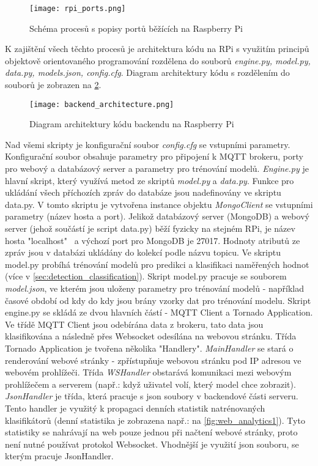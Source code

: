 \begin{figure}[H]
  \centering
  \texttt{[image: rpi\_ports.png]}
  \caption{Schéma procesů s popisy portů běžících na Raspberry Pi}
  \label{fig:rpi_ports}
\end{figure}

K zajištění všech těchto procesů je architektura kódu na RPi s využitím principů objektově orientovaného programování rozdělena do souborů \textit{engine.py, model.py, data.py, models.json, config.cfg}. Diagram architektury kódu s rozdělením do souborů je zobrazen na \cref{fig:backend_architecture}.

\begin{figure}[H]
  \centering
  \texttt{[image: backend\_architecture.png]}
  \caption{Diagram architektury kódu backendu na Raspberry Pi}
  \label{fig:backend_architecture}
\end{figure}

Nad všemi skripty je konfigurační soubor \textit{config.cfg} se vstupními parametry. Konfigurační soubor obsahuje parametry pro připojení k MQTT brokeru, porty pro webový a databázový server a parametry pro trénování modelů. \textit{Engine.py} je hlavní skript, který využívá metod ze skriptů \textit{model.py} a \textit{data.py}. Funkce pro ukládání všech příchozích zpráv do databáze jsou nadefinovány ve skriptu data.py. V tomto skriptu je vytvořena instance objektu \textit{MongoClient} se vstupními parametry (název hosta a port). Jelikož databázový server (MongoDB) a webový server (jehož součástí je script data.py) běží fyzicky na stejném RPi, je název hosta "localhost" \ a výchozí port pro MongoDB je 27017. Hodnoty atributů ze zpráv jsou v databázi ukládány do kolekcí podle názvu topicu. Ve skriptu model.py probíhá trénování modelů pro predikci a klasifikaci naměřených hodnot (více v \cref{sec:detection_classification}). Skript model.py pracuje se souborem \textit{model.json}, ve kterém jsou uloženy parametry pro trénování modelů - například časové období od kdy do kdy jsou brány vzorky dat pro trénování modelu. Skript engine.py se skládá ze dvou hlavních částí - MQTT Client a Tornado Application. Ve třídě MQTT Client jsou odebírána data z brokeru, tato data jsou klasifikována a následně přes Websocket odesílána na webovou stránku. Třída Tornado Application je tvořena několika "Handlery". \textit{MainHandler} se stará o renderování webové stránky - zpřístupňuje webovou stránku pod IP adresou ve webovém prohlížeči. Třída \textit{WSHandler} obstarává komunikaci mezi webovým prohlížečem a serverem (např.: když uživatel volí, který model chce zobrazit). \textit{JsonHandler} je třída, která pracuje s json soubory v backendové části serveru. Tento handler je využitý k propagaci denních statistik natrénovaných klasifikátorů (denní statistika je zobrazena např.: na \cref{fig:web_analytics1}). Tyto statistiky se nahrávají na web pouze jednou při načtení webové stránky, proto není nutné používat protokol Websocket. Vhodnější je využití json souboru, se kterým pracuje JsonHandler.

